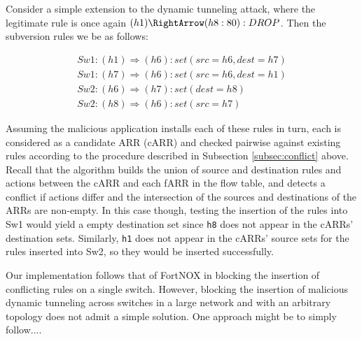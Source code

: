 Consider a simple extension to the dynamic tunneling attack, where the legitimate rule is once again $(h1) \RightArrow (h8:80): DROP$. Then the subversion rules we be as follows: 

\begin{align}
  Sw1: (h1) \Rightarrow (h6): set(src=h6, dest=h7) \\
  Sw1: (h7) \Rightarrow (h6): set(src=h6, dest=h1) \\
  Sw2: (h6) \Rightarrow (h7): set(dest=h8) \\
  Sw2: (h8) \Rightarrow (h6): set(src=h7)
\end{align}

Assuming the malicious application installs each of these rules in turn, each is considered as a candidate ARR (cARR) and checked pairwise against existing rules according to the procedure described in Subsection \ref{subsec:conflict} above. Recall that the algorithm builds the union of source and destination rules and actions between the cARR and each fARR in the flow table, and detects a conflict if actions differ and the intersection of the sources and destinations of the ARRs are non-empty. In this case though, testing the insertion of the rules into Sw1 would yield a empty destination set since \texttt{h8} does not appear in the cARRs' destination sets. Similarly, \texttt{h1} does not appear in the cARRs' source sets for the rules inserted into Sw2, so they would be inserted successfully. 

Our implementation follows that of FortNOX in blocking the insertion of conflicting rules on a single switch. However, blocking the insertion of malicious dynamic tunneling across switches in a large network and with an arbitrary topology does not admit a simple solution. One approach might be to simply follow....

